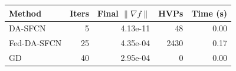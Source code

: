 \begin{tabular}{@{}lrrrr@{}}
\toprule
Method & Iters & Final $\|\nabla f\|$ & HVPs & Time (s) \\
\midrule
DA-SFCN & 5 & 4.13e-11 & 48 & 0.00 \\
Fed-DA-SFCN & 25 & 4.35e-04 & 2430 & 0.17 \\
GD & 40 & 2.95e-04 & 0 & 0.00 \\
\bottomrule
\end{tabular}